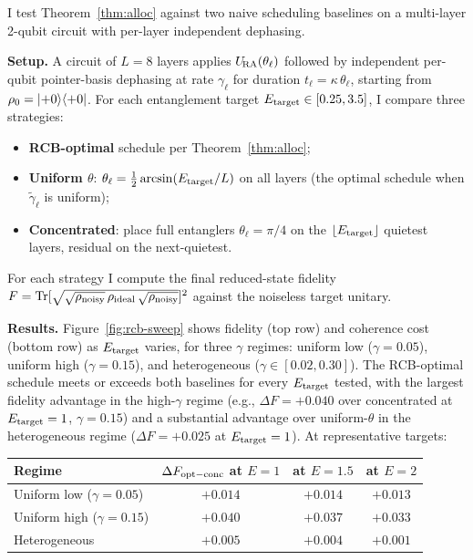 I test Theorem~\ref{thm:alloc} against two naive scheduling
baselines on a multi-layer 2-qubit circuit with per-layer independent
dephasing.

\textbf{Setup.}
A circuit of $L = 8$ layers applies $U_{\!\mathrm{RA}}(\theta_\ell)$ followed by
independent per-qubit pointer-basis dephasing at rate $\gamma_\ell$
for duration $t_\ell = \kappa\,\theta_\ell$, starting from
$\rho_0 = \ket{+0}\!\bra{+0}$.
For each entanglement target $E_{\rm target} \in [0.25, 3.5]$, I
compare three strategies:
\begin{itemize}
  \item \textbf{RCB-optimal} schedule per Theorem~\ref{thm:alloc};
  \item \textbf{Uniform $\theta$}: $\theta_\ell = \tfrac{1}{2}\arcsin(E_{\rm target}/L)$
        on all layers (the optimal schedule when $\tilde\gamma_\ell$ is uniform);
  \item \textbf{Concentrated}: place full entanglers
        $\theta_\ell = \pi/4$ on the $\lfloor E_{\rm target}\rfloor$
        quietest layers, residual on the next-quietest.
\end{itemize}
For each strategy I compute the final reduced-state fidelity
$F = \mathrm{Tr}[\sqrt{\sqrt{\rho_{\rm noisy}}\,\rho_{\rm ideal}\,\sqrt{\rho_{\rm noisy}}}]^2$
against the noiseless target unitary.

\textbf{Results.}
Figure~\ref{fig:rcb-sweep} shows fidelity (top row) and coherence cost
(bottom row) as $E_{\rm target}$ varies, for three $\gamma$ regimes:
uniform low ($\gamma = 0.05$), uniform high ($\gamma = 0.15$), and
heterogeneous ($\gamma \in [0.02, 0.30]$).
The RCB-optimal schedule meets or exceeds both baselines for every
$E_{\rm target}$ tested, with the largest fidelity advantage in the
high-$\gamma$ regime (e.g., $\Delta F = +0.040$ over concentrated at
$E_{\rm target} = 1$, $\gamma = 0.15$) and a substantial advantage
over uniform-$\theta$ in the heterogeneous regime
($\Delta F = +0.025$ at $E_{\rm target} = 1$).
At representative targets:

\begin{center}
\small
\begin{tabular}{lccc}
\toprule
Regime & $\Delta F_{\rm opt - conc}$ at $E\!=\!1$ & at $E\!=\!1.5$ & at $E\!=\!2$ \\
\midrule
Uniform low ($\gamma\!=\!0.05$) & $+0.014$ & $+0.014$ & $+0.013$ \\
Uniform high ($\gamma\!=\!0.15$) & $\mathbf{+0.040}$ & $+0.037$ & $+0.033$ \\
Heterogeneous & $+0.005$ & $+0.004$ & $+0.001$ \\
\bottomrule
\end{tabular}
\end{center}

